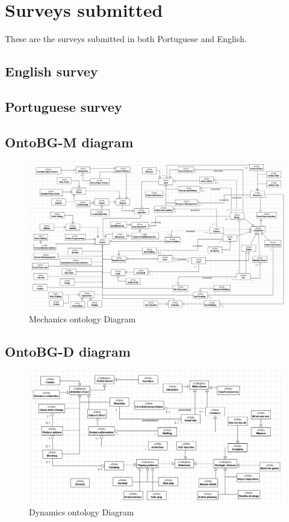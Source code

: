 \chapter{Surveys submitted}

These are the surveys submitted in both Portuguese and English.

\section{ English survey}
\label{appendix:a1}



\section{ Portuguese survey}
\label{appendix:a2}


\section{OntoBG-M diagram}
\label{appendix:a3}
\begin{figure}[h!]
    \centering
    \includegraphics[scale = 0.38, angle = 90]{Images/Model/mechanics.png}
    \caption{Mechanics ontology Diagram}
    \label{fig:mechDiagram}
\end{figure}

\section{OntoBG-D diagram}
\label{appendix:a4}
\begin{figure}[h!]
    \centering
    \includegraphics[scale = 0.52, angle = 90]{Images/Model/Dynamics.png}
    \caption{Dynamics ontology Diagram}
    \label{fig:dyanDiagram}
\end{figure}

